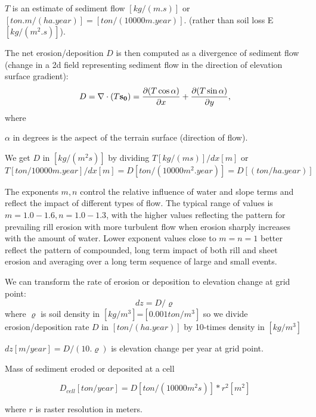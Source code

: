 \noindent
$T$ is an estimate of sediment flow $[kg/(m.s)]$ or
$[ton.m/(ha.year)] = [ton/(10000m.year)]$.
(rather than soil loss E $[kg/(m^2.s)]$).

\noindent
The net erosion/deposition $D$ is then computed as a divergence of sediment
flow (change in a 2d field representing sediment flow in the direction of
elevation surface gradient):
$$
D=\nabla\cdot (T{\bf s_0}) = {\partial (T \cos \alpha) \over {\partial x}} +
{\partial (T \sin \alpha) \over {\partial y}},
$$
\noindent
where 

\noindent
$\alpha$ in degrees is the aspect of the terrain surface (direction of flow).

\noindent
We get $D$ in $[kg/(m^2s)]$ by dividing $T[kg/(ms)] / dx[m]$ 
or $T[ton/10000m.year]/dx[m]=D[ton/(10000m^2. year)]=D[(ton/ha.year)]$

The exponents $m,n$ control the relative influence of water and slope
terms and reflect the impact of different types of flow. The typical range of
values is $m=1.0-1.6, n=1.0-1.3$, with the higher values reflecting the pattern
for prevailing rill erosion with more turbulent flow when erosion sharply
increases with the amount of water.  Lower exponent values close to $m=n=1$
better reflect the pattern of compounded, long term impact of both rill and
sheet erosion and averaging over a long term sequence of large and small
events.

We can transform the rate of erosion or deposition to 
elevation change at grid point:
$$
dz=D/\varrho
$$
\noindent
where
$\varrho$ is soil density in $[kg/m^3]$=$[0.001 ton / m^3]$ so we divide 
erosion/deposition rate $D$ in $[ton/(ha.year)]$ by 10-times density 
in $[kg/m^3]$

\noindent
$dz[m/year]=D/(10.\varrho)$ is elevation change per year at grid point.

\noindent
Mass of sediment eroded or deposited at a cell 

$$D_{cell}[ton/year]=D[ton/(10000m^2s)]*r^2[m^2]$$

\noindent
where $r$ is raster resolution in meters.

\bye

